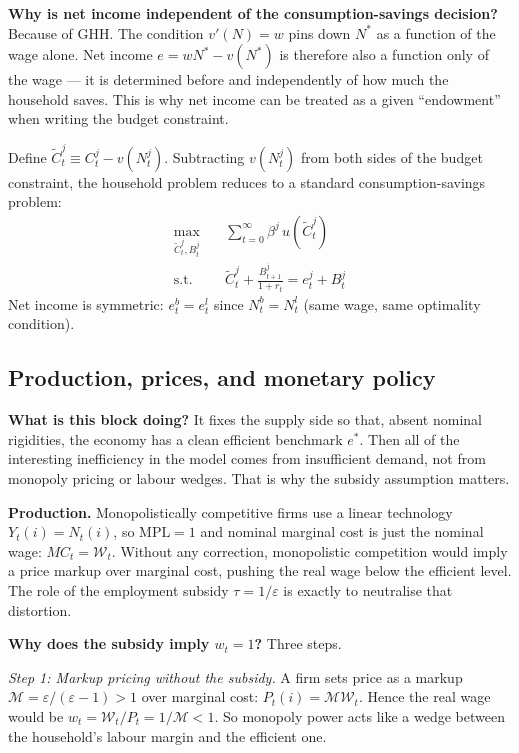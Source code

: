 \documentclass[11pt,a4paper]{article}
\begin{document}
\textbf{Why is net income independent of the consumption-savings decision?} Because of GHH. The condition $v'(N) = w$ pins down $N^*$ as a function of the wage alone. Net income $e = wN^* - v(N^*)$ is therefore also a function only of the wage --- it is determined before and independently of how much the household saves. This is why net income can be treated as a given ``endowment'' when writing the budget constraint.

Define $\tilde{C}_t^j \equiv C_t^j - v(N_t^j)$. Subtracting $v(N_t^j)$ from both sides of the budget constraint, the household problem reduces to a standard consumption-savings problem:
\begin{equation}
\begin{aligned}
    \max_{\tilde{C}_t^j, B_t^j} & \quad \sum_{t=0}^{\infty} \beta^j \, u(\tilde{C}_t^j) \\
    \text{s.t.} & \quad \tilde{C}_t^j + \frac{B_{t+1}^j}{1+r_t} = e_t^j + B_t^j
\end{aligned}
\end{equation}
Net income is symmetric: $e_t^b = e_t^l$ since $N_t^b = N_t^l$ (same wage, same optimality condition).

\subsection{Production, prices, and monetary policy}

\textbf{What is this block doing?} It fixes the supply side so that, absent nominal rigidities, the economy has a clean efficient benchmark $e^*$. Then all of the interesting inefficiency in the model comes from insufficient demand, not from monopoly pricing or labour wedges. That is why the subsidy assumption matters.

\textbf{Production.} Monopolistically competitive firms use a linear technology $Y_t(i) = N_t(i)$, so $\mathrm{MPL} = 1$ and nominal marginal cost is just the nominal wage: $MC_t = \mathcal{W}_t$. Without any correction, monopolistic competition would imply a price markup over marginal cost, pushing the real wage below the efficient level. The role of the employment subsidy $\tau = 1/\varepsilon$ is exactly to neutralise that distortion.

\textbf{Why does the subsidy imply $w_t=1$?} Three steps.

\textit{Step 1: Markup pricing without the subsidy.} A firm sets price as a markup $\mathcal{M} = \varepsilon/(\varepsilon-1) > 1$ over marginal cost: $P_t(i) = \mathcal{M}\mathcal{W}_t$. Hence the real wage would be $w_t = \mathcal{W}_t/P_t = 1/\mathcal{M} < 1$. So monopoly power acts like a wedge between the household's labour margin and the efficient one.
\end{document}

